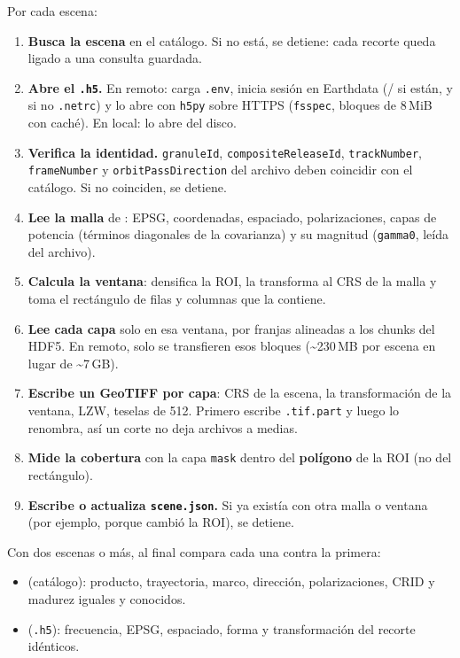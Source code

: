 \documentclass[11pt,a4paper]{article}
\begin{document}
Por cada escena:

\begin{enumerate}
  \item \textbf{Busca la escena} en el catálogo. Si no está, se detiene: cada recorte queda ligado a una consulta guardada.
  \item \textbf{Abre el \texttt{.h5}.} En remoto: carga \texttt{.env}, inicia sesión en Earthdata
        (/ si están, y si no \texttt{.netrc}) y lo abre con \texttt{h5py} sobre HTTPS
        (\texttt{fsspec}, bloques de 8\,MiB con caché). En local: lo abre del disco.
  \item \textbf{Verifica la identidad.} \texttt{granuleId}, \texttt{compositeReleaseId}, \texttt{trackNumber}, \texttt{frameNumber} y
        \texttt{orbitPassDirection} del archivo deben coincidir con el catálogo. Si no coinciden, se detiene.
  \item \textbf{Lee la malla} de : EPSG, coordenadas, espaciado, polarizaciones, capas de
        potencia (términos diagonales de la covarianza) y su magnitud (\texttt{gamma0}, leída del archivo).
  \item \textbf{Calcula la ventana}: densifica la ROI, la transforma al CRS de la malla y toma el rectángulo de filas y columnas que la contiene.
  \item \textbf{Lee cada capa} solo en esa ventana, por franjas alineadas a los chunks del HDF5. En remoto, solo se transfieren esos
        bloques (\textasciitilde 230\,MB por escena en lugar de \textasciitilde 7\,GB).
  \item \textbf{Escribe un GeoTIFF por capa}: CRS de la escena, la transformación de la ventana, LZW, teselas de 512. Primero escribe
        \texttt{.tif.part} y luego lo renombra, así un corte no deja archivos a medias.
  \item \textbf{Mide la cobertura} con la capa \texttt{mask} dentro del \textbf{polígono} de la ROI (no del rectángulo).
  \item \textbf{Escribe o actualiza \texttt{scene.json}.} Si ya existía con otra malla o ventana (por ejemplo, porque cambió la ROI), se detiene.
\end{enumerate}

Con dos escenas o más, al final compara cada una contra la primera:

\begin{itemize}
  \item {} (catálogo): producto, trayectoria, marco, dirección, polarizaciones, CRID y madurez iguales y conocidos.
  \item {} (\texttt{.h5}): frecuencia, EPSG, espaciado, forma y transformación del recorte idénticos.
\end{itemize}
\end{document}
